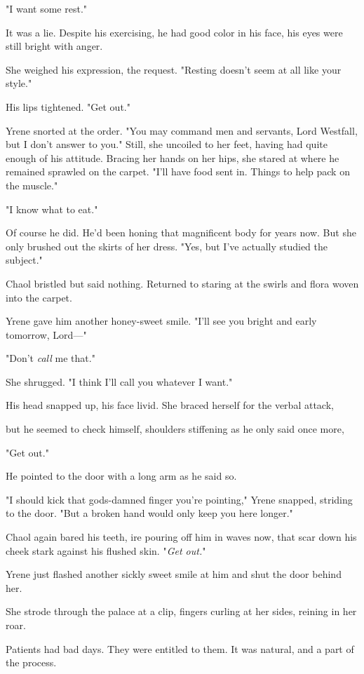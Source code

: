 "I want some rest."

It was a lie.
Despite his exercising, he had good color in his face, his eyes were still bright with anger.

She weighed his expression, the request.
"Resting doesn't seem at all like your style."

His lips tightened.
"Get out."

Yrene snorted at the order.
"You may command men and servants, Lord Westfall, but I don't answer to you."
Still, she uncoiled to her feet, having had quite enough of his attitude.
Bracing her hands on her hips, she stared at where he remained sprawled on the carpet.
"I'll have food sent in.
Things to help pack on the muscle."

"I know what to eat."

Of course he did.
He'd been honing that magnificent body for years now.
But she only brushed out the skirts of her dress.
"Yes, but I've actually studied the subject."

Chaol bristled but said nothing.
Returned to staring at the swirls and flora woven into the carpet.

Yrene gave him another honey-sweet smile.
"I'll see you bright and early tomorrow, Lord---"

"Don't \emph{call} me that."

She shrugged.
"I think I'll call you whatever I want."

His head snapped up, his face livid.
She braced herself for the verbal attack,

but he seemed to check himself, shoulders stiffening as he only said once more,

"Get out."

He pointed to the door with a long arm as he said so.

"I should kick that gods-damned finger you're pointing," Yrene snapped, striding to the door.
"But a broken hand would only keep you here longer."

Chaol again bared his teeth, ire pouring off him in waves now, that scar down his cheek stark against his flushed skin.
"\emph{Get out.}"

Yrene just flashed another sickly sweet smile at him and shut the door behind her.

She strode through the palace at a clip, fingers curling at her sides, reining in her roar.

Patients had bad days.
They were entitled to them.
It was natural, and a part of the process.

